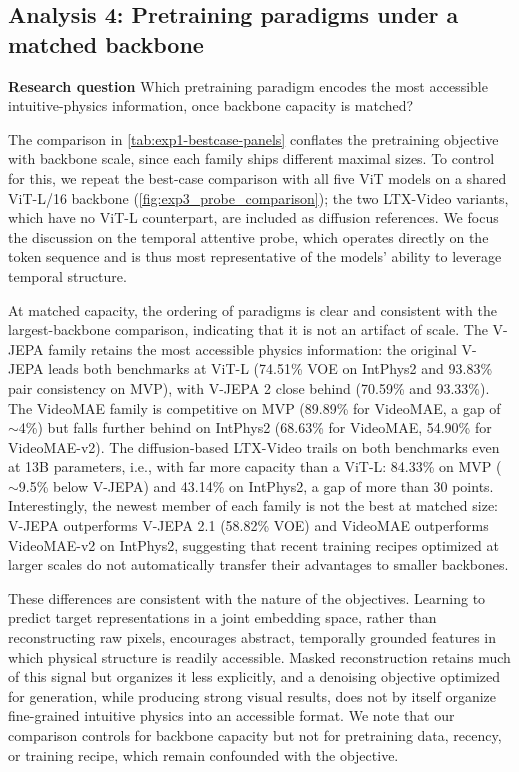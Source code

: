 \subsection*{Analysis 4: Pretraining paradigms under a matched backbone}
\label{sec:exp4}

\begin{researchquestionbox}
\textbf{Research question}
Which pretraining paradigm encodes the most accessible intuitive-physics
information, once backbone capacity is matched?
\end{researchquestionbox}

The comparison in \autoref{tab:exp1-bestcase-panels} conflates the pretraining
objective with backbone scale, since each family ships different maximal sizes.
To control for this, we repeat the best-case comparison with all five ViT
models on a shared ViT-L/16 backbone (\autoref{fig:exp3_probe_comparison}); the
two LTX-Video variants, which have no ViT-L counterpart, are included as
diffusion references. We focus the discussion on the temporal attentive probe,
which operates directly on the token sequence and is thus most representative
of the models' ability to leverage temporal structure.

At matched capacity, the ordering of paradigms is clear and consistent with the
largest-backbone comparison, indicating that it is not an artifact of scale.
The V-JEPA family retains the most accessible physics information: the original
V-JEPA leads both benchmarks at ViT-L (74.51\% VOE on IntPhys2 and 93.83\% pair
consistency on MVP), with V-JEPA 2 close behind (70.59\% and 93.33\%). The
VideoMAE family is competitive on MVP (89.89\% for VideoMAE, a gap of
$\sim$4\%) but falls further behind on IntPhys2 (68.63\% for VideoMAE, 54.90\%
for VideoMAE-v2). The diffusion-based LTX-Video trails on both benchmarks even
at 13B parameters, i.e., with far more capacity than a ViT-L: 84.33\% on MVP
($\sim$9.5\% below V-JEPA) and 43.14\% on IntPhys2, a gap of more than 30
points. Interestingly, the newest member of each family is not the best at
matched size: V-JEPA outperforms V-JEPA 2.1 (58.82\% VOE) and VideoMAE
outperforms VideoMAE-v2 on IntPhys2, suggesting that recent training recipes
optimized at larger scales do not automatically transfer their advantages to
smaller backbones.

These differences are consistent with the nature of the objectives. Learning to
predict target representations in a joint embedding space, rather than
reconstructing raw pixels, encourages abstract, temporally grounded features in
which physical structure is readily accessible. Masked reconstruction retains
much of this signal but organizes it less explicitly, and a denoising objective
optimized for generation, while producing strong visual results, does not by
itself organize fine-grained intuitive physics into an accessible format. We
note that our comparison controls for backbone capacity but not for pretraining
data, recency, or training recipe, which remain confounded with the objective.

